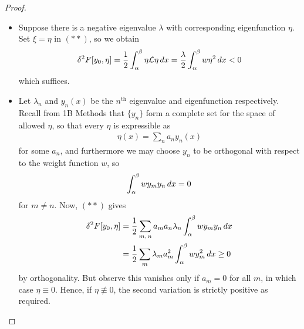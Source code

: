 \documentclass{../template/note}
\begin{document}
    \begin{proof}
        \begin{itemize}
            \item [$\implies$] Suppose there is a negative eigenvalue $\lambda$ with corresponding eigenfunction $\eta$. Set $\xi = \eta$ in $(**)$, so we obtain
            \begin{align*}
                \delta^2 F[y_0, \eta] = \frac 1 2 \int_\alpha^\beta \eta \mathcal{L} \eta \,d{x} = \frac \lambda 2 \int_\alpha^\beta w\eta^2 \,d{x} < 0
            \end{align*}
            which suffices.    
            \item [$\impliedby$] Let $\lambda_n$ and $y_n(x)$ be the $n^\text{th}$ eigenvalue and eigenfunction respectively. Recall from 1B Methods that $\{y_n\}$ form a complete set for the space of allowed $\eta$, so that every $\eta$ is expressible as
            \begin{align*}
                \eta(x) = \sum_n a_n y_n(x)
            \end{align*}
            for some $a_n$, and furthermore we may choose $y_n$ to be orthogonal with respect to the weight function $w$, so
            \begin{align*}
                \int_\alpha^\beta w y_m y_n \,d{x} = 0
            \end{align*}
            for $m \neq n$. Now, $(**)$ gives
            \begin{align*}
                \delta^2 F[y_0, \eta] &= \frac 1 2 \sum_{m,\, n} a_m a_n \lambda_n \int_\alpha^\beta w y_m y_n \,d{x} \\
                &= \frac 1 2 \sum_m \lambda_m a_m^2 \int_\alpha^\beta wy_m^2 \,d{x} \geq 0
            \end{align*}
            by orthogonality. But observe this vanishes only if $a_m = 0$ for all $m$, in which case $\eta \equiv 0$. Hence, if $\eta \not\equiv 0$, the second variation is strictly positive as required.
        \end{itemize}
    \end{proof}
    
\end{document}
